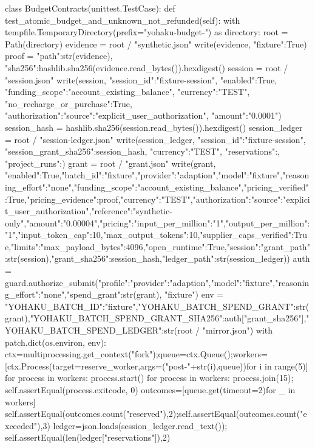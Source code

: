 class BudgetContracts(unittest.TestCase):
    def test_atomic_budget_and_unknown_not_refunded(self):
        with tempfile.TemporaryDirectory(prefix="yohaku-budget-") as directory:
            root = Path(directory)
            evidence = root / "synthetic.json"
            write(evidence, {"fixture":True})
            proof = {"path":str(evidence), "sha256":hashlib.sha256(evidence.read_bytes()).hexdigest()}
            session = root / "session.json"
            write(session, {"session_id":"fixture-session", "enabled":True, "funding_scope":"account_existing_balance", "currency":"TEST", "no_recharge_or_purchase":True, "authorization":{"source":"explicit_user_authorization", "amount":"0.0001"}})
            session_hash = hashlib.sha256(session.read_bytes()).hexdigest()
            session_ledger = root / "session-ledger.json"
            write(session_ledger, {"session_id":"fixture-session", "session_grant_sha256":session_hash, "currency":"TEST", "reservations":{}, "project_runs":{}})
            grant = root / "grant.json"
            write(grant, {"enabled":True,"batch_id":"fixture","provider":"adaption","model":"fixture","reasoning_effort":"none","funding_scope":"account_existing_balance","pricing_verified":True,"pricing_evidence":proof,"currency":"TEST","authorization":{"source":"explicit_user_authorization","reference":"synthetic-only","amount":"0.00004"},"pricing":{"input_per_million":"1","output_per_million":"1","input_token_cap":10,"max_output_tokens":10,"supplier_caps_verified":True},"limits":{"max_payload_bytes":4096},"open_runtime":True,"session":{"grant_path":str(session),"grant_sha256":session_hash,"ledger_path":str(session_ledger)}})
            auth = guard.authorize_submit({"profile":{"provider":"adaption","model":"fixture","reasoning_effort":"none"},"spend_grant":str(grant)}, "fixture")
            env = {"YOHAKU_BATCH_ID":"fixture","YOHAKU_BATCH_SPEND_GRANT":str(grant),"YOHAKU_BATCH_SPEND_GRANT_SHA256":auth["grant_sha256"],"YOHAKU_BATCH_SPEND_LEDGER":str(root / "mirror.json")}
            with patch.dict(os.environ, env):
                ctx=multiprocessing.get_context("fork");queue=ctx.Queue();workers=[ctx.Process(target=reserve_worker,args=("post-"+str(i),queue))for i in range(5)]
                for process in workers: process.start()
                for process in workers: process.join(15); self.assertEqual(process.exitcode, 0)
                outcomes=[queue.get(timeout=2)for _ in workers]
                self.assertEqual(outcomes.count("reserved"),2);self.assertEqual(outcomes.count("exceeded"),3)
                ledger=json.loads(session_ledger.read_text()); self.assertEqual(len(ledger["reservations"]),2)
